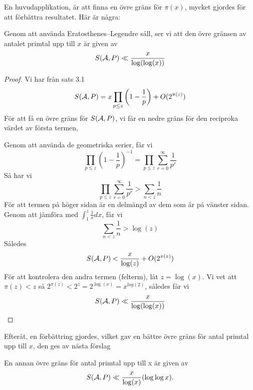 En huvudapplikation, är att finna en övre gräns för $ \pi(x) $, mycket gjordes för att förbättra resultatet. Här är några:
\begin{proposition}
    Genom att använda Eratosthenes–Legendre såll, ser vi att den övre gränsen av antalet primtal upp till $ x $ är given av
\[S(\mathcal{A}, P)\ll\frac{x}{\log(\log(x))}\]
\end{proposition}
\begin{proof}
Vi har från sats 3.1
\[S(\mathcal{A}, P)=x \prod_{p\leq z}\left( 1-\frac{1}{p} \right) +O(2^{\pi(z)})\]
För att få en övre gräns för $ S(\mathcal{A}, P) $, vi får en nedre gräns för den reciproka värdet av första termen, 

Genom att använda de geometriska serier, får vi
\[\prod_{p\leq z}\left( 1-\frac{1}{p} \right)^{-1}=\prod_{p\leq z}\sum_{r=0}^{\infty}\frac{1}{p^{r}}\]
Så har vi
\[\prod_{p\leq z}\sum_{r=0}^{\infty}\frac{1}{p^{r}}>\sum_{n<z}\frac{1}{n}\]
För att termen på höger sidan är en delmängd av dem som är på vänster sidan.\\

Genom att jämföra med $ \int_{1}^{z}\frac{1}{x}dx $, får vi
\[\sum_{n<z}\frac{1}{n}>\log(z)\]
Således
\[S(\mathcal{A}, P)<\frac{x}{\log(z)}+O(2^{\pi(z)})\]
För att kontrolera den andra termen (felterm), låt $ z=\log(x)$. Vi vet att $ \pi(z)<z $ så $ 2^{\pi(z)}<2^{z}=2^{\log(x)}=x^{log(2)} $, således får vi
\[S(\mathcal{A}, P)\ll\frac{x}{\log(\log(x))}\]
\end{proof}
Efteråt, en förbättring gjordes, vilket gav en bättre övre gräns för antal primtal upp till $ x $, den ges av nästa förslag
\begin{proposition}
En annan övre gräns för antal primtal upp till x är given av
\[S(\mathcal{A}, P)\ll\frac{x}{\log(x)}(\log\log x).\]
\end{proposition}

